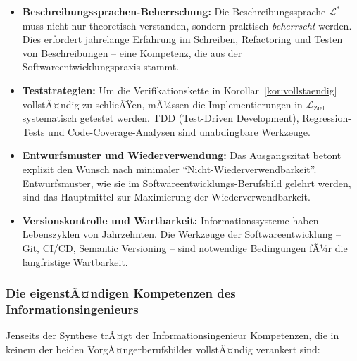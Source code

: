 ﻿\documentclass[a4paper,12pt]{article}
\theoremstyle{definition}
\begin{document}
\begin{itemize}
  \item \textbf{Beschreibungssprachen-Beherrschung:}
        Die Beschreibungssprache $\mathcal{L}^*$ muss nicht nur theoretisch
        verstanden, sondern praktisch \emph{beherrscht} werden. Dies erfordert
        jahrelange Erfahrung im Schreiben, Refactoring und Testen von Beschreibungen --
        eine Kompetenz, die aus der Softwareentwicklungspraxis stammt.
  \item \textbf{Teststrategien:}
        Um die Verifikationskette in Korollar~\ref{kor:vollstaendig} vollstÃ¤ndig
        zu schlieÃŸen, mÃ¼ssen die Implementierungen in $\mathcal{L}_{\text{Ziel}}$
        systematisch getestet werden. TDD (Test-Driven Development), Regression-Tests
        und Code-Coverage-Analysen sind unabdingbare Werkzeuge.
  \item \textbf{Entwurfsmuster und Wiederverwendung:}
        Das Ausgangszitat betont explizit den Wunsch nach minimaler
        \enquote{Nicht-Wiederverwendbarkeit}. Entwurfsmuster, wie sie im
        Softwareentwicklungs-Berufsbild gelehrt werden, sind das Hauptmittel zur
        Maximierung der Wiederverwendbarkeit.
  \item \textbf{Versionskontrolle und Wartbarkeit:}
        Informationssysteme haben Lebenszyklen von Jahrzehnten. Die Werkzeuge der
        Softwareentwicklung -- Git, CI/CD, Semantic Versioning -- sind notwendige
        Bedingungen fÃ¼r die langfristige Wartbarkeit.
\end{itemize}

\subsubsection{Die eigenstÃ¤ndigen Kompetenzen des Informationsingenieurs}

Jenseits der Synthese trÃ¤gt der Informationsingenieur Kompetenzen, die in keinem der
beiden VorgÃ¤ngerberufsbilder vollstÃ¤ndig verankert sind:
\end{document}
